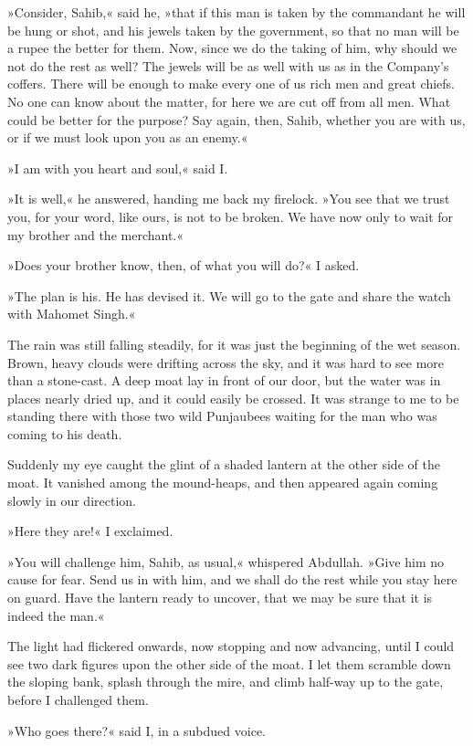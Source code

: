 »Consider, Sahib,« said he, »that if this man is taken by the commandant he will be hung or shot, and his jewels taken by the government, so that no man will be a rupee the better for them. Now, since we do the taking of him, why should we not do the rest as well? The jewels will be as well with us as in the Company's coffers. There will be enough to make every one of us rich men and great chiefs. No one can know about the matter, for here we are cut off from all men. What could be better for the purpose? Say again, then, Sahib, whether you are with us, or if we must look upon you as an enemy.«

»I am with you heart and soul,« said I.

»It is well,« he answered, handing me back my firelock. »You see that we trust you, for your word, like ours, is not to be broken. We have now only to wait for my brother and the merchant.«

»Does your brother know, then, of what you will do?« I asked.

»The plan is his. He has devised it. We will go to the gate and share the watch with Mahomet Singh.«

The rain was still falling steadily, for it was just the beginning of the wet season. Brown, heavy clouds were drifting across the sky, and it was hard to see more than a stone-cast. A deep moat lay in front of our door, but the water was in places nearly dried up, and it could easily be crossed. It was strange to me to be standing there with those two wild Punjaubees waiting for the man who was coming to his death.

Suddenly my eye caught the glint of a shaded lantern at the other side of the moat. It vanished among the mound-heaps, and then appeared again coming slowly in our direction.

»Here they are!« I exclaimed.

»You will challenge him, Sahib, as usual,« whispered Abdullah. »Give him no cause for fear. Send us in with him, and we shall do the rest while you stay here on guard. Have the lantern ready to uncover, that we may be sure that it is indeed the man.«

The light had flickered onwards, now stopping and now advancing, until I could see two dark figures upon the other side of the moat. I let them scramble down the sloping bank, splash through the mire, and climb half-way up to the gate, before I challenged them.

»Who goes there?« said I, in a subdued voice.

